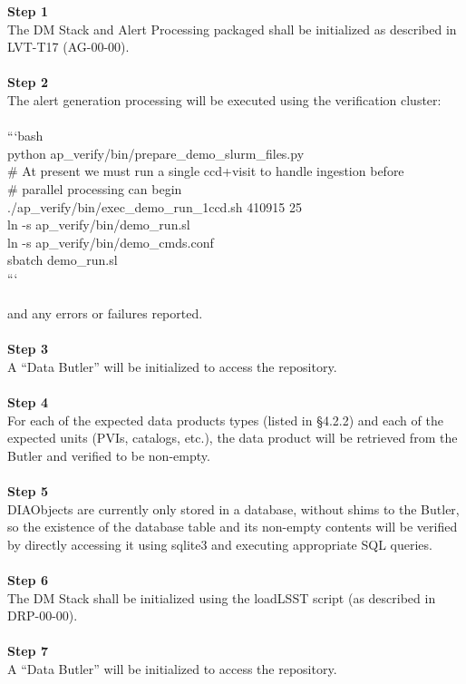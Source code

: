 \textbf{Step 1}\\
The DM Stack and Alert Processing packaged shall be initialized as
described in LVT-T17 (AG-00-00).\\
~\\
\textbf{Step 2}\\
The alert generation processing will be executed using the verification
cluster:\\
~\\
```bash\\
python ap\_verify/bin/prepare\_demo\_slurm\_files.py\\
\# At present we must run a single ccd+visit to handle ingestion
before\\
\# parallel processing can begin\\
./ap\_verify/bin/exec\_demo\_run\_1ccd.sh 410915 25\\
ln -s ap\_verify/bin/demo\_run.sl\\
ln -s ap\_verify/bin/demo\_cmds.conf\\
sbatch demo\_run.sl\\
```\\
~\\
and any errors or failures reported.\\
~\\
\textbf{Step 3}\\
A ``Data Butler'' will be initialized to access the repository.\\
~\\
\textbf{Step 4}\\
For each of the expected data products types (listed in §4.2.2) and each
of the expected units (PVIs, catalogs, etc.), the data product will be
retrieved from the Butler and verified to be non-empty.\\
~\\
\textbf{Step 5}\\
DIAObjects are currently only stored in a database, without shims to the
Butler, so the existence of the database table and its non-empty
contents will be verified by directly accessing it using sqlite3 and
executing appropriate SQL queries.\\
~\\
\textbf{Step 6}\\
The DM Stack shall be initialized using the loadLSST script (as
described in DRP-00-00).\\
~\\
\textbf{Step 7}\\
A ``Data Butler'' will be initialized to access the repository.\\
